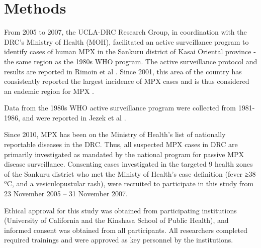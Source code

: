 \section{Methods}

From 2005 to 2007, the UCLA-DRC Research Group, in coordination with the DRC’s Ministry of Health (MOH), facilitated an active surveillance program to identify cases of human MPX in the Sankuru district of Kasai Oriental province - the same region as the 1980s WHO program. The active surveillance protocol and results are reported in Rimoin et al \cite{Rimoin2010}. Since 2001, this area of the country has consistently reported the largest incidence of MPX cases and is thus considered an endemic region for MPX \cite{Rimoin2010}. 

Data from the 1980s WHO active surveillance program were collected from 1981-1986, and were reported in Jezek et al \cite{Jezek1988}.

Since 2010, MPX has been on the Ministry of Health's list of nationally reportable diseases in the DRC. Thus, all suspected MPX cases in DRC are primarily investigated as mandated by the national program for passive MPX disease surveillance. Consenting cases investigated in the targeted 9 health zones of the Sankuru district who met the  Ministy of Health’s case definition (fever ≥38 ºC, and a vesiculopustular rash), were recruited to participate in this study from 23 November 2005 – 31 November 2007. 

Ethical approval for this study was obtained from participating institutions (University of California and the Kinshasa School of Public Health), and informed consent was obtained from all participants. All researchers completed required trainings and were approved as key personnel by the institutions. 